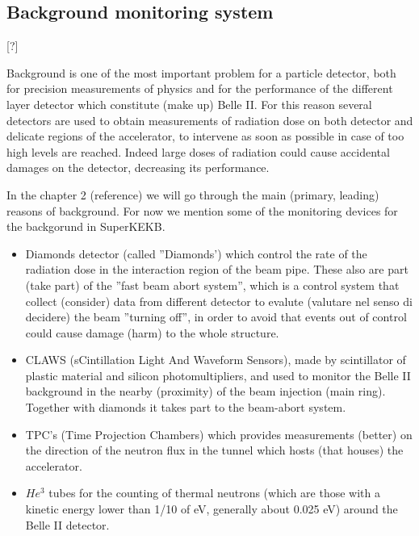 




\subsection{Background monitoring system} [?]

Background is one of the most important problem for a particle detector, both for precision measurements of physics and for the performance of the different layer detector which constitute (make up) Belle II. For this reason several detectors are used to obtain measurements of radiation dose on both detector and delicate regions of the accelerator, to intervene as soon as possible in case of too high levels are reached. Indeed large doses of radiation could cause accidental damages on the detector, decreasing its performance.

In the chapter 2 (reference) we will go through the main (primary, leading) reasons of background. For now we mention some of the monitoring devices for the backgorund in SuperKEKB.


\begin{itemize}
\item Diamonds detector (called ''Diamonds') which control the rate of the radiation dose in the interaction region of the beam pipe. These also are part (take part) of the ''fast beam abort system'', which is a control system that collect (consider) data from different detector to evalute (valutare nel senso di decidere) the beam ''turning off'', in order to avoid that events out of control could cause damage (harm) to the whole structure.
\item CLAWS (sCintillation Light And Waveform Sensors), made by scintillator of plastic material and silicon photomultipliers, and used to monitor the Belle II background in the nearby (proximity) of the beam injection (main ring). Together with diamonds it takes part to the beam-abort system.
\item TPC's (Time Projection Chambers) which provides measurements (better) on the direction of the neutron flux in the tunnel which hosts (that houses) the accelerator.
\item $He^{3}$ tubes for the counting of thermal neutrons (which are those with a kinetic energy lower than 1/10 of eV, generally about 0.025 eV) around the Belle II detector.
\end{itemize}


